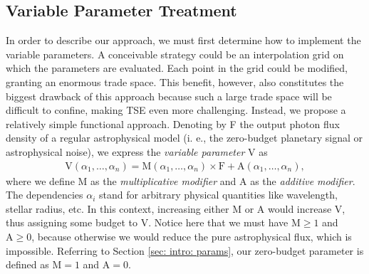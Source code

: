 \documentclass[12pt,a4paper]{article}
\numberwithin{equation}{section}
\numberwithin{figure}{section}
\numberwithin{table}{section}
\begin{document}
\subsection{Variable Parameter Treatment} \label{sec: intro: varparams descr}
In order to describe our approach, we must first determine how to implement the variable parameters. A conceivable strategy could be an interpolation grid on which the parameters are evaluated. Each point in the grid could be modified, granting an enormous trade space. This benefit, however, also constitutes the biggest drawback of this approach because such a large trade space will be difficult to confine, making TSE even more challenging. Instead, we propose a relatively simple functional approach. Denoting by F the output photon flux density of a regular astrophysical model (i. e., the zero-budget planetary signal or astrophysical noise), we express the \textit{variable parameter} V as
\begin{align} \label{eq: variable parameter}
    \text{V}(\alpha_1, \dots, \alpha_n) = \text{M}(\alpha_1, \dots, \alpha_n) \times \text{F} + \text{A}(\alpha_1, \dots, \alpha_n),
\end{align}
where we define M as the \textit{multiplicative modifier} and A as the \textit{additive modifier}. The dependencies $\alpha_i$ stand for arbitrary physical quantities like wavelength, stellar radius, etc. In this context, increasing either M or A would increase V, thus assigning some budget to V. Notice here that we must have $\text{M} \geq 1$ and $\text{A} \geq 0$, because otherwise we would reduce the pure astrophysical flux, which is impossible. Referring to Section \ref{sec: intro: params}, our zero-budget parameter is defined as $\text{M} = 1$ and $\text{A} = 0$.
\end{document}
